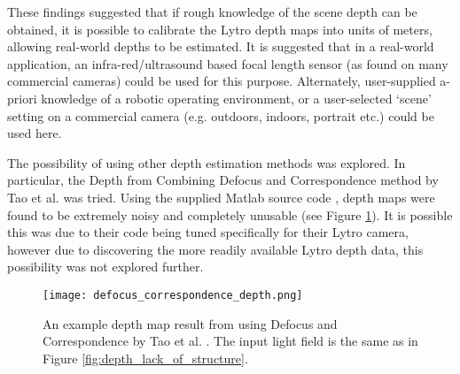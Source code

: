 These findings suggested that if rough knowledge of the scene depth can be obtained, it is possible to calibrate the Lytro depth maps into units of meters, allowing real-world depths to be estimated.
It is suggested that in a real-world application, an infra-red/ultrasound based focal length sensor (as found on many commercial cameras) could be used for this purpose.
Alternately, user-supplied a-priori knowledge of a robotic operating environment, or a user-selected \enquote*{scene} setting on a commercial camera (e.g. outdoors, indoors, portrait etc.) could be used here.

The possibility of using other depth estimation methods was explored.
In particular, the Depth from Combining Defocus and Correspondence method by Tao et al. \cite{tao2013depth} was tried.
Using the supplied Matlab source code \cite{tao2013depthwebsite}, depth maps were found to be extremely noisy and completely unusable (see Figure \ref{fig:defocus_correspondence_depth}).
It is possible this was due to their code being tuned specifically for their Lytro camera, however due to discovering the more readily available Lytro depth data, this possibility was not explored further.


\begin{figure}
\centering
\texttt{[image: defocus\_correspondence\_depth.png]}
\caption[Depth Map from combining Defocus and Correspondence]{
An example depth map result from using Defocus and Correspondence by Tao et al. \cite{tao2013depthwebsite}.
The input light field is the same as in Figure \ref{fig:depth_lack_of_structure}.
}
\label{fig:defocus_correspondence_depth}
\end{figure}
